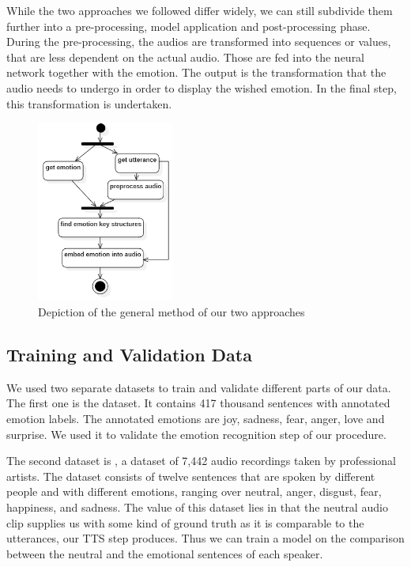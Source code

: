 \documentclass[11pt]{article}
\begin{document}
While the two approaches we followed differ widely, we can still subdivide them further into a pre-processing, model application and post-processing phase. During the pre-processing, the audios are transformed into sequences or values, that are less dependent on the actual audio. Those are fed into the neural network together with the emotion. The output is the transformation that the audio needs to undergo in order to display the wished emotion. In the final step, this transformation is undertaken.

\begin{figure}[h]
 \centering
\includegraphics[width=0.4\textwidth]{"Bilder/Prozess.PNG"}
\caption{Depiction of the general method of our two approaches}
\label{Ablauf}
\end{figure}

\subsection{Training and Validation Data}
We used two separate datasets to train and validate different parts of our data.
The first one is the \cite{saravia-etal-2018-carer} dataset. It contains 417 thousand sentences with annotated emotion labels. The annotated emotions are joy, sadness, fear, anger, love and surprise. We used it to validate the emotion recognition step of our procedure.

The second dataset is \cite{cao_data}, a dataset of 7,442 audio recordings taken by professional artists. The dataset consists of twelve sentences that are spoken by different people and with different emotions, ranging over neutral, anger, disgust, fear, happiness, and sadness. The value of this dataset lies in that the neutral audio clip supplies us with some kind of ground truth as it is comparable to the utterances, our TTS step produces. Thus we can train a model on the comparison between the neutral and the emotional sentences of each speaker.
\end{document}
